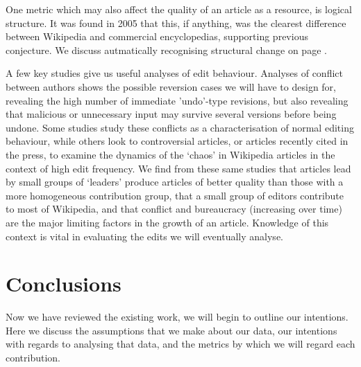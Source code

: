 \documentclass[a4paper,11pt,twoside,notitlepage]{article}
\begin{document}
        One metric which may also affect the quality of an article as
        a resource, is logical structure. It was found in 2005 that
        this, if anything, was the clearest difference between
        Wikipedia and commercial encyclopedias,\cite{Giles2005}
        supporting previous conjecture.\cite{Denning2005} We discuss
        autmatically recognising structural change on page \pageref{restructuring}. 
        
        A few key studies give us useful analyses of edit
        behaviour. Analyses of conflict between authors shows the
        possible reversion cases we will have to design for, revealing
        the high number of immediate 'undo'-type revisions, but also
        revealing that malicious or unnecessary input may survive
        several versions before being undone. Some studies study these
        conflicts as a characterisation of normal editing
        behaviour,\cite{Kittur2007}\cite{Kittur2009}\cite{Kittur2010}\cite{Potthast}
        while others look to controversial articles,\cite{Iba2010} or
        articles recently cited in the press,\cite{Lih2004} to examine
        the dynamics of the `chaos' in Wikipedia articles in the
        context of high edit frequency. We find from these same
        studies that articles lead by small groups of `leaders'
        produce articles of better quality than those with a more
        homogeneous contribution group, that a small group of editors
        contribute to most of Wikipedia, and that conflict and
        bureaucracy (increasing over time) are the major limiting
        factors in the growth of an article.\cite{Suh2009} Knowledge
        of this context is vital in evaluating the edits we will
        eventually analyse.


        \section{Conclusions}
        Now we have reviewed the existing work, we will begin to
        outline our intentions. Here we discuss the assumptions that
        we make about our data, our intentions with regards to
        analysing that data, and the metrics by which we will regard
        each contribution.

\end{document}

